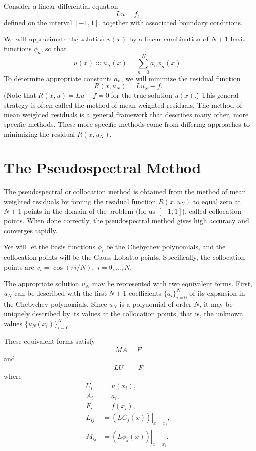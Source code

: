 \label{lab:pseudospectral1_revision}

Consider a linear differential equation 
\[Lu = f, \]
defined on the interval $[-1,1]$, together with associated boundary conditions. 

We will approximate the solution $u(x)$ by a linear combination of $N+1$ basis functions $\phi_n$, so that 
\[
u(x) \approx u_N(x) = \sum_{n=0}^N a_n \phi_n(x). 
\]
To determine appropriate constants $a_n$, we will minimize the residual function 
\[
R(x,u_N) = Lu_N - f.
\]
(Note that $R(x,u) = Lu - f = 0$ for the true solution $u(x)$.) 
This general strategy is often called the method of mean weighted residuals. The method of mean weighted residuals is a general framework that describes many other, more specific methods. These more specific methods come from differing approaches to minimizing the residual $R(x,u_N)$.


\section*{The Pseudospectral Method}
The pseudospectral or collocation method is obtained from the method of mean weighted residuals by forcing the residual function $R(x,u_N)$ to equal zero at $N+1$ points in the domain of the problem (for us $[-1,1]$), called collocation points. 
When done correctly, the pseudospectral method gives high accuracy and converges rapidly. 

We will let the basis functions $\phi_i$ be the Chebychev polynomials, and the collocation points will be the Gauss-Lobatto points. 
Specifically, the collocation points are $x_i = \cos(\pi i /N),$ $ i = 0, \ldots, N$.


The appropriate solution $u_N$ may be represented with two equivalent forms. 
First, $u_N$ can be described with the first $N+1$ coefficients  $\{a_i\}_{i=0}^N$ of its expansion in the Chebychev polynomials. 
Since $u_N$ is a polynomial of order $N$, it may be uniquely described by its values at the collocation points, that is, the unknown values  $\{u_N(x_i)\}_{i=0}^N$.

These equivalent forms satisfy
\begin{align}
	MA = F \label{spectral1b:chebychev_expansion}
\end{align}
and
\begin{align}
	LU &= F \label{spectral1b:grid_point}
\end{align}
where 
\begin{align*}
	U_i &= u(x_i),\\
	A_i &= a_i,\\
	F_i &= f(x_i),\\
	L_{ij} &= \left.(LC_j(x))\right|_{x=x_i},\\
	M_{ij} &= \left.(L\phi_j(x))\right|_{x=x_i}. 
\end{align*}

